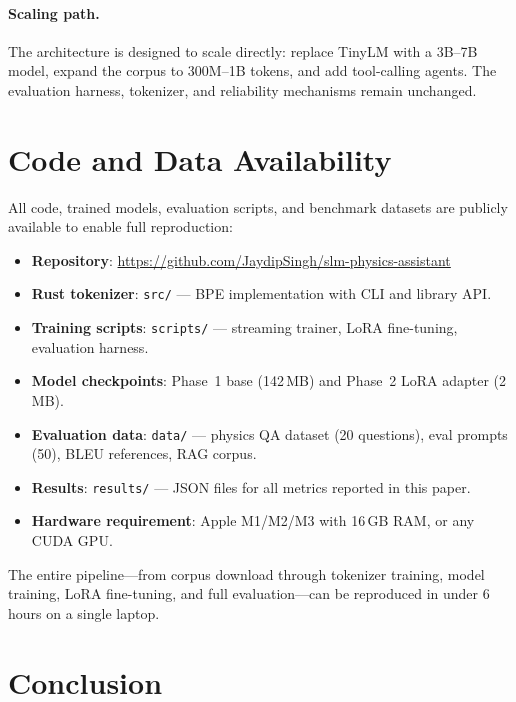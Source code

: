 \documentclass[11pt]{article}
\begin{document}
\paragraph{Scaling path.}
The architecture is designed to scale directly: replace TinyLM with a 3B--7B model, expand the corpus to 300M--1B tokens, and add tool-calling agents. The evaluation harness, tokenizer, and reliability mechanisms remain unchanged.

\section{Code and Data Availability}
\label{sec:code}

All code, trained models, evaluation scripts, and benchmark datasets are publicly available to enable full reproduction:

\begin{itemize}[leftmargin=*]
    \item \textbf{Repository}: \url{https://github.com/JaydipSingh/slm-physics-assistant}
    \item \textbf{Rust tokenizer}: \texttt{src/} --- BPE implementation with CLI and library API.
    \item \textbf{Training scripts}: \texttt{scripts/} --- streaming trainer, LoRA fine-tuning, evaluation harness.
    \item \textbf{Model checkpoints}: Phase~1 base (142\,MB) and Phase~2 LoRA adapter (2\,MB).
    \item \textbf{Evaluation data}: \texttt{data/} --- physics QA dataset (20 questions), eval prompts (50), BLEU references, RAG corpus.
    \item \textbf{Results}: \texttt{results/} --- JSON files for all metrics reported in this paper.
    \item \textbf{Hardware requirement}: Apple M1/M2/M3 with 16\,GB RAM, or any CUDA GPU.
\end{itemize}

The entire pipeline---from corpus download through tokenizer training, model training, LoRA fine-tuning, and full evaluation---can be reproduced in under 6 hours on a single laptop.

\section{Conclusion}
\label{sec:conclusion}
\end{document}
